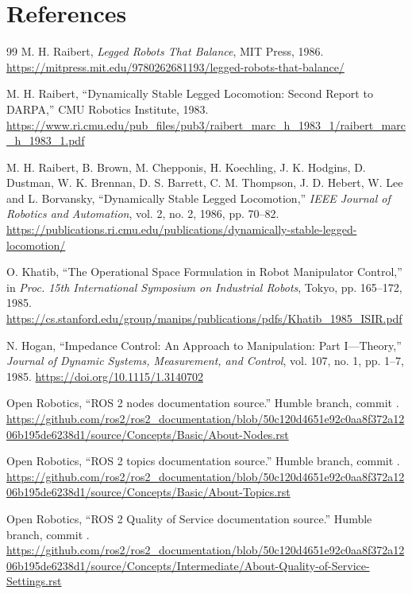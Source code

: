 \documentclass[11pt,a4paper]{article}
\begin{document}
\section{References}

\begin{thebibliography}{99}\small
{}
M. H. Raibert, \emph{Legged Robots That Balance}, MIT Press, 1986.
\url{https://mitpress.mit.edu/9780262681193/legged-robots-that-balance/}

M. H. Raibert, ``Dynamically Stable Legged Locomotion: Second Report to
DARPA,'' CMU Robotics Institute, 1983.
\url{https://www.ri.cmu.edu/pub_files/pub3/raibert_marc_h_1983_1/raibert_marc_h_1983_1.pdf}

M. H. Raibert, B. Brown, M. Chepponis, H. Koechling, J. K. Hodgins,
D. Dustman, W. K. Brennan, D. S. Barrett, C. M. Thompson, J. D. Hebert,
W. Lee and L. Borvansky, ``Dynamically Stable Legged Locomotion,''
\emph{IEEE Journal of Robotics and Automation}, vol. 2, no. 2, 1986,
pp. 70--82. \url{https://publications.ri.cmu.edu/publications/dynamically-stable-legged-locomotion/}

O. Khatib, ``The Operational Space Formulation in Robot Manipulator Control,''
in \emph{Proc. 15th International Symposium on Industrial Robots}, Tokyo,
pp. 165--172, 1985.
\url{https://cs.stanford.edu/group/manips/publications/pdfs/Khatib_1985_ISIR.pdf}

N. Hogan, ``Impedance Control: An Approach to Manipulation: Part I---Theory,''
\emph{Journal of Dynamic Systems, Measurement, and Control}, vol. 107, no. 1,
pp. 1--7, 1985.
\url{https://doi.org/10.1115/1.3140702}

Open Robotics, ``ROS 2 nodes documentation source.''
Humble branch, commit .
\url{https://github.com/ros2/ros2_documentation/blob/50c120d4651e92c0aa8f372a1206b195de6238d1/source/Concepts/Basic/About-Nodes.rst}

Open Robotics, ``ROS 2 topics documentation source.''
Humble branch, commit .
\url{https://github.com/ros2/ros2_documentation/blob/50c120d4651e92c0aa8f372a1206b195de6238d1/source/Concepts/Basic/About-Topics.rst}

Open Robotics, ``ROS 2 Quality of Service documentation source.''
Humble branch, commit .
\url{https://github.com/ros2/ros2_documentation/blob/50c120d4651e92c0aa8f372a1206b195de6238d1/source/Concepts/Intermediate/About-Quality-of-Service-Settings.rst}


\end{thebibliography}
\end{document}
